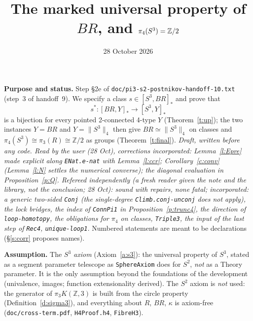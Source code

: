 \documentclass[11pt]{amsart}
\title{The marked universal property of $BR$, and $\pi_4(S^3)=\Z/2$}
\date{28 October 2026}
\theoremstyle{definition}
\theoremstyle{remark}
\newcommand{\Z}{\mathbb{Z}}
\newcommand{\code}[1]{\texttt{#1}}
\newcommand{\hc}[2]{[#1,#2]_*}
\newcommand{\tr}[1]{\|#1\|}
\begin{document}
\maketitle

\noindent\textbf{Purpose and status.} Step \S2e of
\code{doc/pi3-s2-postnikov-handoff-10.txt} (step~3 of handoff~9). We
specify a class $s\in\hc{S^3}{BR}$ and prove that
\[s^*:\hc{BR}Y\to\hc{S^3}Y\]
is a bijection for every pointed 2-connected 4-type $Y$
(Theorem~\ref{t:up}); the two instances $Y=BR$ and $Y=\tr{S^3}_4$ then give
$BR\simeq\tr{S^3}_4$ on classes and $\pi_4(S^3)\cong\pi_3(R)\cong\Z/2$ as
groups (Theorem~\ref{t:final}). \emph{Draft, written before any code. Read by the user (28 Oct), corrections incorporated:
Lemma~\ref{l:Epre} made explicit along \code{ENat.e-nat} with Lemma~\ref{l:ccr};
Corollary~\ref{c:conv} (Lemma~\ref{l:N} settles the numerical converse); the
diagonal evaluation in Proposition~\ref{p:Q}. \emph{Refereed} independently
(a fresh reader given the note and the library, not the conclusion; 28 Oct): sound
with repairs, none fatal; incorporated: a generic two-sided \code{Conj} (the
single-degree \code{Climb.conj-unconj} does not apply), the lock bridges, the index of
\code{ConnPi1} in Proposition~\ref{p:trunc4}, the direction of \code{loop-homotopy}, the
obligations for $\pi_4$ on classes, \code{Triple3}, the input of the last step of
\code{Rec4}, \code{unique-loop1}.} Numbered statements are meant to be declarations
(\S\ref{s:corr} proposes names).

\smallskip\noindent\textbf{Assumption.} The \emph{$S^3$ axiom}
(Axiom~\ref{a:s3}): the universal property of $S^3$, stated as a segment
parameter telescope as \code{SphereAxiom} does for $S^2$, \emph{not} as a
Theory parameter. It is the only assumption beyond the foundations of the
development (univalence, images; function extensionality derived). The
$S^2$ axiom is \emph{not} used: the generator of $\pi_3K(\Z,3)$ is built from the
circle property (Definition~\ref{d:sigma3}), and everything about $R$, $BR$,
$\kappa$ is axiom-free (\code{doc/cross-term.pdf}, \code{H4Proof.h4},
\code{FibreH3}).
\end{document}
